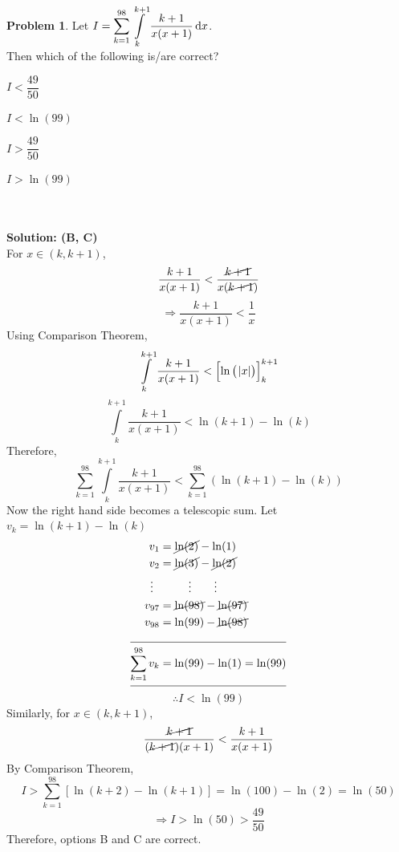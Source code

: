 \documentclass[14]{article}
\theoremstyle{definition}
\newtheorem{prob}{Problem}
\theoremstyle{case}
\begin{document}
\pagebreak
\begin{prob}
Let $I = \displaystyle\sum\limits_{k=1}^{98} \int\limits_k^{k+1}\dfrac{k+1}{x(x+1)} \dif x$.\\
Then which of the following is/are correct?\\
\begin{enumerate*}[label=(\Alph*)]
\item $I < \dfrac{49}{50}\quad\quad
$\item $I < \ln(99)\quad\quad$
\item $I > \dfrac{49}{50}\quad\quad$
\item $I > \ln(99)\quad\quad$
\end{enumerate*}\\\\
\textbf{Solution: (B, C) }\\
For $x \in (k, k+1)$,
\[\dfrac{k+1}{x(x+1)} < \dfrac{\cancel{k+1}}{x(\cancel{k+1})}\]
\[\Rightarrow \dfrac{k+1}{x(x+1)} < \dfrac{1}{x}\]
Using Comparison Theorem,
\[\int\limits_k^{k+1} \dfrac{k+1}{x(x+1)} < \left[\ln\left(\;\abs{x}\right) \right]_k^{k+1}\]
\[\int\limits_k^{k+1} \dfrac{k+1}{x(x+1)} < \ln(k+1) - \ln(k)\]
Therefore,
\[\sum\limits_{k=1}^{98} \int\limits_k^{k+1} \dfrac{k+1}{x(x+1)} < \sum\limits_{k=1}^{98} \left(\ln(k+1) - \ln(k)\right)\]
Now the right hand side becomes a telescopic sum.
Let $v_k = \ln(k+1) - \ln(k)$
\begin{align*}
v_1 &= \cancel{\ln(2)} - \ln(1)\\
v_2 &= \cancel{\ln(3)} - \cancel{\ln(2)}\\
\vdots \;\; & \;\; \quad\quad\vdots \quad\quad \vdots\\
v_{97} &= \cancel{\ln(98)} - \cancel{\ln(97)}\\
v_{98} &= \ln(99) - \cancel{\ln(98)}\\
\cline{1-2}
\sum\limits_{k=1}^{98} v_k &= \ln(99) - \ln(1) = \ln(99)\\
\cline{1-2}
\end{align*}
\[\therefore I < \ln(99)\]
Similarly, for $x \in (k, k+1)$,
\[\dfrac{\cancel{k+1}}{(\cancel{k+1})(x+1)} < \dfrac{k+1}{x(x+1)}\]
By Comparison Theorem,
\[I > \sum\limits_{k=1}^{98} \left[\ln(k+2) - \ln(k+1) \right] = \ln(100) - \ln(2) = \ln(50)\]
\[\Rightarrow I > \ln(50) > \dfrac{49}{50}\]
Therefore, options B and C are correct.
\end{prob}
\pagebreak
\end{document}
